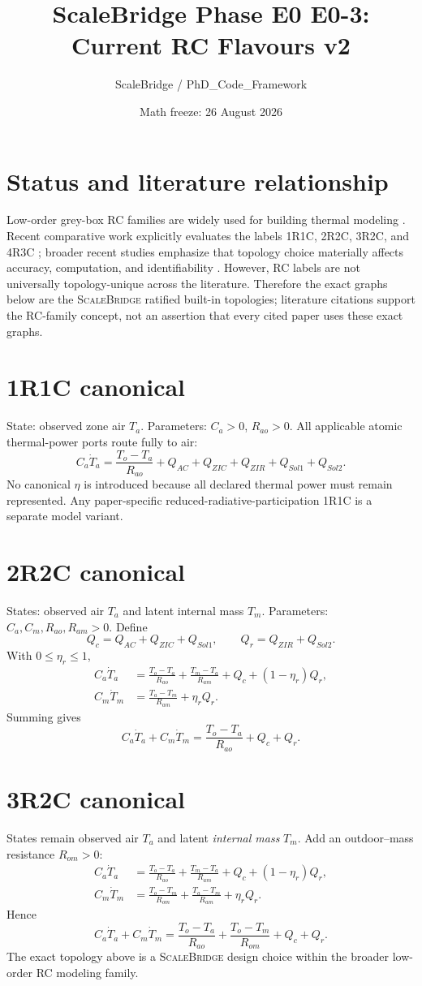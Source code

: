 \documentclass[11pt]{article}
\title{ScaleBridge Phase E0 E0-3: Current RC Flavours v2}
\author{ScaleBridge / PhD\_Code\_Framework}
\date{Math freeze: 26 August 2026}
\newcommand{\ScaleBridge}{\textsc{ScaleBridge}}
\begin{document}
\maketitle

\section{Status and literature relationship}
Low-order grey-box RC families are widely used for building thermal modeling \citep{BacherMadsen2011HeatDynamics,WangChenLi2019RCSimplification}.  Recent comparative work explicitly evaluates the labels 1R1C, 2R2C, 3R2C, and 4R3C \citep{PanagiEtAl2026GreyBoxTuning}; broader recent studies emphasize that topology choice materially affects accuracy, computation, and identifiability \citep{ChenKorolijaRovas2026SingleZoneRC}.  However, RC labels are not universally topology-unique across the literature.  Therefore the exact graphs below are the \ScaleBridge{} ratified built-in topologies; literature citations support the RC-family concept, not an assertion that every cited paper uses these exact graphs.

\section{1R1C canonical}
State: observed zone air $T_a$.  Parameters: $C_a>0$, $R_{ao}>0$.  All applicable atomic thermal-power ports route fully to air:
\[
C_a\dot T_a=\frac{T_o-T_a}{R_{ao}}+Q_{AC}+Q_{ZIC}+Q_{ZIR}+Q_{Sol1}+Q_{Sol2}.
\]
No canonical $\eta$ is introduced because all declared thermal power must remain represented.  Any paper-specific reduced-radiative-participation 1R1C is a separate model variant.

\section{2R2C canonical}
States: observed air $T_a$ and latent internal mass $T_m$. Parameters: $C_a,C_m,R_{ao},R_{am}>0$. Define
\[
Q_c=Q_{AC}+Q_{ZIC}+Q_{Sol1},\qquad Q_r=Q_{ZIR}+Q_{Sol2}.
\]
With $0\le\eta_r\le1$,
\begin{align}
C_a\dot T_a &= \frac{T_o-T_a}{R_{ao}}+\frac{T_m-T_a}{R_{am}}+Q_c+(1-\eta_r)Q_r,\\
C_m\dot T_m &= \frac{T_a-T_m}{R_{am}}+\eta_rQ_r.
\end{align}
Summing gives
\[
C_a\dot T_a+C_m\dot T_m=\frac{T_o-T_a}{R_{ao}}+Q_c+Q_r.
\]

\section{3R2C canonical}
States remain observed air $T_a$ and latent \emph{internal mass} $T_m$.  Add an outdoor--mass resistance $R_{om}>0$:
\begin{align}
C_a\dot T_a &= \frac{T_o-T_a}{R_{ao}}+\frac{T_m-T_a}{R_{am}}+Q_c+(1-\eta_r)Q_r,\\
C_m\dot T_m &= \frac{T_o-T_m}{R_{om}}+\frac{T_a-T_m}{R_{am}}+\eta_rQ_r.
\end{align}
Hence
\[
C_a\dot T_a+C_m\dot T_m=\frac{T_o-T_a}{R_{ao}}+\frac{T_o-T_m}{R_{om}}+Q_c+Q_r.
\]
The exact topology above is a \ScaleBridge{} design choice within the broader low-order RC modeling family.
\end{document}
